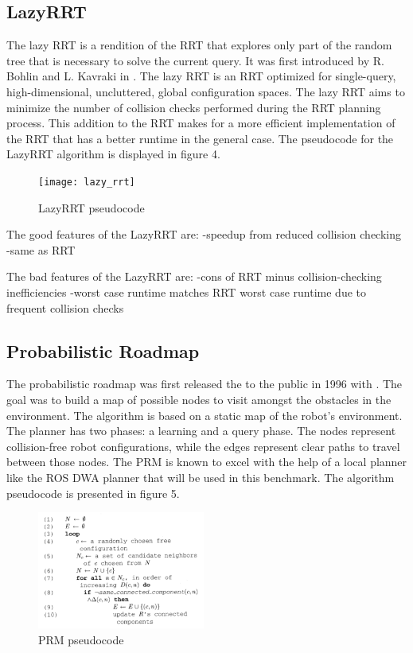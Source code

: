 \documentclass[conference]{IEEEtran} \usepackage[T1]{fontenc} \usepackage[backend=biber, style=ieee]{biblatex}
\begin{document}
\subsection{LazyRRT} \label{LazyRRT}
The lazy RRT is a rendition of the RRT that explores only part of the random tree that is necessary to solve the current query. It was first introduced by R. Bohlin and 
L. Kavraki in \cite{lazy_rrt}. The lazy RRT is an RRT optimized for single-query, high-dimensional, uncluttered, global configuration spaces. The lazy RRT aims to 
minimize the number of collision checks performed during the RRT planning process. This addition to the RRT makes for a more efficient implementation of the RRT that has 
a better runtime in the general case. The pseudocode for the LazyRRT algorithm is displayed in figure 4.

\begin{figure}
\label{figure4} 
\centering 
\texttt{[image: lazy\_rrt]}
\caption{LazyRRT pseudocode}
\end{figure}

The good features of the LazyRRT are:
-speedup from reduced collision checking
-same as RRT

The bad features of the LazyRRT are:
-cons of RRT minus collision-checking inefficiencies
-worst case runtime matches RRT worst case runtime due to frequent collision checks

\subsection{Probabilistic Roadmap} \label{PRM}
The probabilistic roadmap was first released the to the public in 1996 with \cite{prm}. The goal was to build a map of possible nodes to visit amongst the obstacles in 
the environment. The algorithm is based on a static map of the robot's environment. The planner has two phases: a learning and a query phase. The nodes represent 
collision-free robot configurations, while the edges represent clear paths to travel between those nodes. The PRM is known to excel with the help of a local planner like 
the ROS DWA planner that will be used in this benchmark. The algorithm pseudocode is presented in figure 5.

\begin{figure}
\label{figure5} 
\centering 
\includegraphics[width=0.49\textwidth]{prm}
\caption{PRM pseudocode}
\end{figure}
\end{document}
